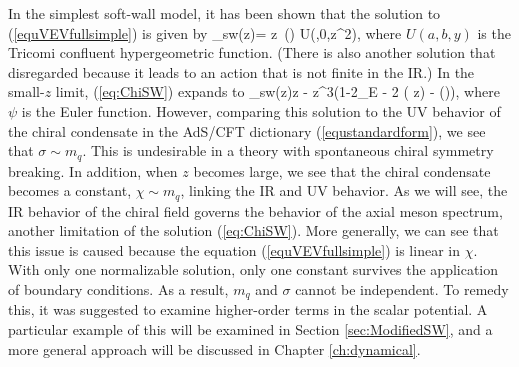 In the simplest soft-wall model, it has been shown \cite{FILL-IN} that the solution to (\ref{equVEVfullsimple}) is given by 
\be
\chi_{sw}(z)=  z \,\Gamma\left(\right) U\left(,0,\lambda z^{2}\right),
\label{eq:ChiSW}
\ee
where $U(a,b,y)$ is the Tricomi confluent hypergeometric function. 
(There is also another solution that disregarded because it leads to an action that is not finite in the IR.)
In the small-$z$ limit, (\ref{eq:ChiSW}) expands to \cite{Colangelo:2008us}
\be
\label{equvevswsolexp}
\chi_{sw}(z)\rightarrow {}z - z^{3}\left(1-2\gamma_{E} - 2 \log(\sqrt{\lambda} z) - \psi\left(\right)\right),
\ee
where $\psi$ is the Euler function.
However, comparing this solution to the UV behavior of the chiral condensate in the AdS/CFT dictionary (\ref{equstandardform}), we see that $\sigma \sim m_q$.
This is undesirable in a theory with spontaneous chiral symmetry breaking.
In addition, when $z$ becomes large, we see that the chiral condensate becomes a constant, $\chi \sim m_q$, linking the IR and UV behavior. 
As we will see, the IR behavior of the chiral field governs the behavior of the axial meson spectrum, another limitation of the solution (\ref{eq:ChiSW}).
More generally, we can see that this issue is caused because the equation (\ref{equVEVfullsimple}) is linear in $\chi$.
With only one normalizable solution, only one constant survives the application of boundary conditions.
As a result, $m_q$ and $\sigma$ cannot be independent.
To remedy this, it was suggested \cite{Karch} to examine higher-order terms in the scalar potential. 
A particular example of this will be examined in Section \ref{sec:ModifiedSW}, and a more general approach will be discussed in Chapter \ref{ch:dynamical}.

